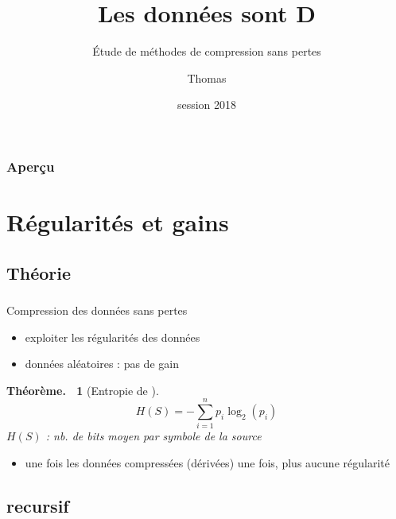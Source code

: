 \documentclass{beamer}
\title{Les données sont D\tss{1}}
\subtitle{\'Etude de méthodes de compression sans pertes}
\author{Thomas \sc{Bagrel}}
\institute{Lycée Henri \sc{Poincaré}, Nancy}
\date{\sc{tipe} session 2018}
\newcommand{\tech}[1]{{\small \sc{#1}}}
\newcommand{\relief}[1]{{\color{structureTextColor} #1}}
\theoremstyle{theoreme}
\newtheorem{theoreme}{Théorème.~}
\begin{document}


\begin{frame}
  \titlepage{}
\end{frame}

\begin{frame}
  \frametitle{Aperçu}

  \tableofcontents %
\end{frame}

\section{Régularités et gains}

\subsection{Théorie}

\begin{frame}
  \frametitle{\secname{}}
  \framesubtitle{\subsecname{}}

  \relief{Compression des données sans pertes}
  \begin{itemize}
    \item \pause exploiter les régularités des données
    \item \pause données aléatoires : pas de gain
  \end{itemize}

  \pause
  \begin{theoreme}[Entropie de ]
  \[
    H(S) = -\sum_{i = 1}^n p_i \log_2(p_i)
  \]
  {\footnotesize $H(S)$ : nb. de bits moyen par symbole de la source }
  \end{theoreme}
  \begin{itemize}
    \item \pause une fois les données compressées (dérivées) une fois, plus aucune régularité
  \end{itemize}
\end{frame}

\subsection{\tech{zip} recursif}
\end{document}
